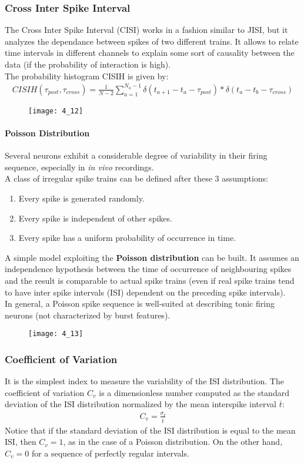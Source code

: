 \subsubsection{Cross Inter Spike Interval}
The Cross Inter Spike Interval (CISI) works in a fashion similar to JISI, but it analyzes the
dependance between spikes of two different trains. It allows to relate time intervals in
different channels to explain some sort of causality between the data (if the probability of
interaction is high).\\
The probability histogram CISIH is given by:
\begin{align*}
    CISIH(\tau_{post},\tau_{cross})=\frac{1}{N-2}\sum_{a=1}^{N_a-1}\delta{(t_{a+1}-t_{a}-\tau_{post})}\ast \delta{(t_a-t_b-\tau_{cross})}
\end{align*}
\begin{figure}[H]
    \texttt{[image: 4\_12]}
    \centering
\end{figure}
\paragraph{Poisson Distribution}
Several neurons exhibit a considerable degree of variability in their firing
sequence, especially in \textit{in vivo} recordings.\\
A class of irregular spike trains can be defined after these 3 assumptions:
\begin{enumerate}
    \item Every spike is generated randomly.
    \item Every spike is independent of other spikes.
    \item Every spike has a uniform probability of occurrence in time.
\end{enumerate}
A simple model exploiting the \textbf{Poisson distribution} can be built. It assumes an
independence hypothesis between the time of occurrence of neighbouring spikes and the
result is comparable to actual spike trains (even if real spike trains tend to have inter
spike intervals (ISI) dependent on the preceding spike intervals).\\
In general, a Poisson spike sequence is well-suited at describing tonic firing neurons
(not characterized by burst features).
\begin{figure}[H]
    \texttt{[image: 4\_13]}
    \centering
\end{figure}
\subsubsection{Coefficient of Variation}
It is the simplest index to measure the variability of the ISI distribution. The
coefficient of variation \(C_v\) is a dimensionless number computed as the
standard deviation of the ISI distribution normalized by the mean interspike
interval \(\overline{t}\):
\begin{align*}
    C_v=\frac{\sigma_t}{\overline{t}}
\end{align*}
Notice that if the standard deviation of the ISI distribution is equal to the mean ISI, then
\(C_v=1\), as in the case of a Poisson distribution. On the other hand,
\(C_v=0\) for a sequence of perfectly regular intervals.
